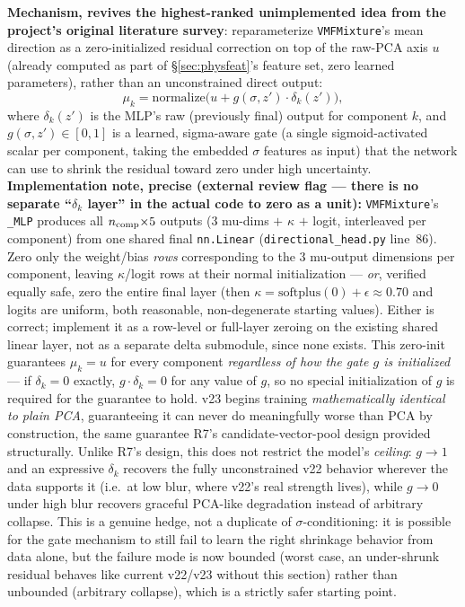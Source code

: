 \documentclass[11pt]{article}
\newcommand{\code}[1]{\texttt{#1}}
\begin{document}
\textbf{Mechanism, revives the highest-ranked unimplemented idea from the project's original
literature survey}: reparameterize \code{VMFMixture}'s mean direction as a zero-initialized
residual correction on top of the raw-PCA axis $u$ (already computed as part of
\S\ref{sec:physfeat}'s feature set, zero learned parameters), rather than an unconstrained
direct output:
\[
  \mu_k = \mathrm{normalize}\big(u + g(\sigma, z')\cdot \delta_k(z')\big),
\]
where $\delta_k(z')$ is the MLP's raw (previously final) output for component $k$, and
$g(\sigma,z')\in[0,1]$ is a learned, sigma-aware gate (a single sigmoid-activated scalar
per component, taking the embedded $\sigma$ features as input) that the network can use to
shrink the residual toward zero under high uncertainty. \textbf{Implementation note, precise
(external review flag --- there is no separate ``$\delta_k$ layer'' in the actual code to
zero as a unit):} \code{VMFMixture}'s \code{\_MLP} produces all $n_{\rm comp}{\times}5$
outputs (3 mu-dims $+$ $\kappa$ $+$ logit, interleaved per component) from one shared final
\code{nn.Linear} (\code{directional\_head.py} line~86). Zero only the weight/bias
\emph{rows} corresponding to the 3 mu-output dimensions per component, leaving
$\kappa$/logit rows at their normal initialization --- \emph{or}, verified equally safe,
zero the entire final layer (then $\kappa=\mathrm{softplus}(0)+\epsilon\approx0.70$ and
logits are uniform, both reasonable, non-degenerate starting values). Either is correct;
implement it as a row-level or full-layer zeroing on the existing shared linear layer, not as
a separate delta submodule, since none exists. This zero-init guarantees $\mu_k = u$ for
every component \emph{regardless of how the gate $g$ is initialized} --- if $\delta_k=0$
exactly, $g\cdot\delta_k=0$ for any value of $g$, so no special initialization of $g$ is
required for the guarantee to hold. v23 begins training
\emph{mathematically identical to plain PCA}, guaranteeing it can never do meaningfully worse
than PCA by construction, the same guarantee R7's candidate-vector-pool design provided
structurally. Unlike R7's design, this does not restrict the model's \emph{ceiling}: $g\to1$
and an expressive $\delta_k$ recovers the fully unconstrained v22 behavior wherever the data
supports it (i.e.\ at low blur, where v22's real strength lives), while $g\to0$ under high
blur recovers graceful PCA-like degradation instead of arbitrary collapse. This is a genuine
hedge, not a duplicate of $\sigma$-conditioning: it is possible for the gate mechanism to
still fail to learn the right shrinkage behavior from data alone, but the failure mode is now
bounded (worst case, an under-shrunk residual behaves like current v22/v23 without this
section) rather than unbounded (arbitrary collapse), which is a strictly safer starting
point.
\end{document}
